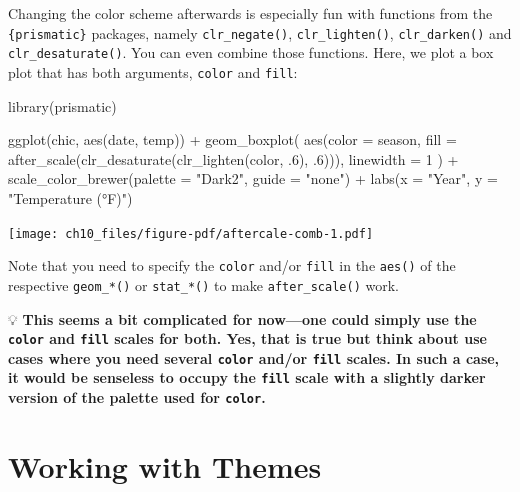 \documentclass[
  letterpaper,
  DIV=11,
  numbers=noendperiod]{scrreprt}
\newenvironment{Shaded}{\begin{snugshade}}{\end{snugshade}}
\newcommand{\AttributeTok}[1]{\textcolor[rgb]{0.40,0.45,0.13}{#1}}
\newcommand{\DecValTok}[1]{\textcolor[rgb]{0.68,0.00,0.00}{#1}}
\newcommand{\FunctionTok}[1]{\textcolor[rgb]{0.28,0.35,0.67}{#1}}
\newcommand{\NormalTok}[1]{\textcolor[rgb]{0.00,0.23,0.31}{#1}}
\newcommand{\SpecialCharTok}[1]{\textcolor[rgb]{0.37,0.37,0.37}{#1}}
\newcommand{\StringTok}[1]{\textcolor[rgb]{0.13,0.47,0.30}{#1}}
\begin{document}
Changing the color scheme afterwards is especially fun with functions
from the \texttt{\{prismatic\}} packages, namely \texttt{clr\_negate()},
\texttt{clr\_lighten()}, \texttt{clr\_darken()} and
\texttt{clr\_desaturate()}. You can even combine those functions. Here,
we plot a box plot that has both arguments, \texttt{color} and
\texttt{fill}:

\begin{Shaded}
\begin{Highlighting}[]
\FunctionTok{library}\NormalTok{(prismatic)}

\FunctionTok{ggplot}\NormalTok{(chic, }\FunctionTok{aes}\NormalTok{(date, temp)) }\SpecialCharTok{+}
  \FunctionTok{geom\_boxplot}\NormalTok{(}
    \FunctionTok{aes}\NormalTok{(}\AttributeTok{color =}\NormalTok{ season,}
        \AttributeTok{fill =} \FunctionTok{after\_scale}\NormalTok{(}\FunctionTok{clr\_desaturate}\NormalTok{(}\FunctionTok{clr\_lighten}\NormalTok{(color, .}\DecValTok{6}\NormalTok{), .}\DecValTok{6}\NormalTok{))),}
    \AttributeTok{linewidth =} \DecValTok{1}
\NormalTok{  ) }\SpecialCharTok{+}
  \FunctionTok{scale\_color\_brewer}\NormalTok{(}\AttributeTok{palette =} \StringTok{"Dark2"}\NormalTok{, }\AttributeTok{guide =} \StringTok{"none"}\NormalTok{) }\SpecialCharTok{+}
  \FunctionTok{labs}\NormalTok{(}\AttributeTok{x =} \StringTok{"Year"}\NormalTok{, }\AttributeTok{y =} \StringTok{"Temperature (°F)"}\NormalTok{)}
\end{Highlighting}
\end{Shaded}

\texttt{[image: ch10\_files/figure-pdf/aftercale-comb-1.pdf]}

Note that you need to specify the \texttt{color} and/or \texttt{fill} in
the \texttt{aes()} of the respective \texttt{geom\_*()} or
\texttt{stat\_*()} to make \texttt{after\_scale()} work.

💡 \textbf{This seems a bit complicated for now---one could simply use
the \texttt{color} and \texttt{fill} scales for both. Yes, that is true
but think about use cases where you need several \texttt{color} and/or
\texttt{fill} scales. In such a case, it would be senseless to occupy
the \texttt{fill} scale with a slightly darker version of the palette
used for \texttt{color}.}


\chapter{Working with Themes}\label{themes}
\end{document}
